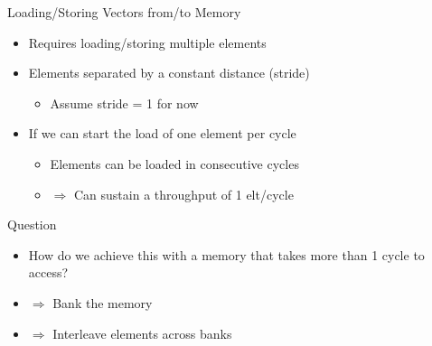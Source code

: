 \documentclass[presentation]{beamer}
\begin{document}
\begin{frame}[label={sec:org9090c74}]{Loading/Storing Vectors from/to Memory}
\begin{block}{}
\begin{itemize}
\item Requires loading/storing multiple elements
\item Elements separated by a \alert{constant} distance (stride)
\begin{itemize}
\item Assume stride = 1 for now
\end{itemize}
\item If we can start the load of one element per cycle
\begin{itemize}
\item Elements can be loaded in \alert{consecutive cycles}
\item \(\Rightarrow\) Can sustain a \alert{throughput of 1 elt/cycle}
\end{itemize}
\end{itemize}
\end{block}
\begin{block}{Question}
\begin{itemize}
\item How do we achieve this with a memory that takes more than 1 cycle to access?
\end{itemize}
\pause
\begin{itemize}
\item \(\Rightarrow\) \alert{Bank the memory}
\item \(\Rightarrow\) Interleave elements across banks
\end{itemize}
\end{block}
\end{frame}
\end{document}
